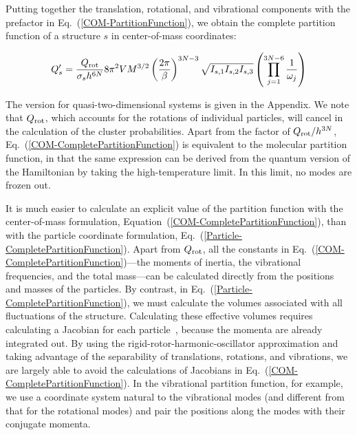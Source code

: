 \documentclass[pre, aps, twocolumn, reprint, amsmath,amssymb, showpacs,
superscriptaddress] {revtex4-1}
\begin{document}
Putting together the translation, rotational, and vibrational components
with the prefactor in Eq.~(\ref{COM-PartitionFunction}), we obtain the
complete partition function of a structure $s$ in center-of-mass
coordinates:
\begin{widetext}
  \begin{equation}\label{COM-CompletePartitionFunction}
    	Q_s' = \frac{Q_\textnormal{rot}}{\sigma_s h^{6N}} { 8 \pi^2 V M^{3/2}}
      \left( {\frac{2\pi}{\beta}} \right)^{3N-3} \sqrt{I_{s, 1} I_{s, 2}
        I_{s, 3}} \left( \prod_{j=1}^{3N-6} \frac{1}{\omega_j} \right)
  \end{equation}
\end{widetext}
The version for quasi-two-dimensional systems is given in the Appendix.
We note that $Q_\textnormal{rot}$, which accounts for the rotations of
individual particles, will cancel in the calculation of the cluster
probabilities. Apart from the factor of $Q_\textnormal{rot}/h^{3N}$,
Eq.~(\ref{COM-CompletePartitionFunction}) is equivalent to the molecular
partition function, in that the same expression can be derived from the
quantum version of the Hamiltonian by taking the high-temperature limit.
In this limit, no modes are frozen out.

It is much easier to calculate an explicit value of the partition
function with the center-of-mass formulation,
Equation~(\ref{COM-CompletePartitionFunction}), than with the particle
coordinate formulation, Eq.~(\ref{Particle-CompletePartitionFunction}).
Apart from $Q_\textnormal{rot}$, all the constants in
Eq.~(\ref{COM-CompletePartitionFunction})---the moments of inertia, the
vibrational frequencies, and the total mass---can be calculated directly
from the positions and masses of the particles. By contrast, in
Eq.~(\ref{Particle-CompletePartitionFunction}), we must calculate the
volumes associated with all fluctuations of the structure. Calculating
these effective volumes requires calculating a Jacobian for each
particle~\cite{herschbach59, boresch96}, because the momenta are already
integrated out. By using the rigid-rotor-harmonic-oscillator
approximation and taking advantage of the separability of translations,
rotations, and vibrations, we are largely able to avoid the calculations
of Jacobians in Eq.~(\ref{COM-CompletePartitionFunction}). In the
vibrational partition function, for example, we use a coordinate system
natural to the vibrational modes (and different from that for the
rotational modes) and pair the positions along the modes with their
conjugate momenta.
\end{document}
